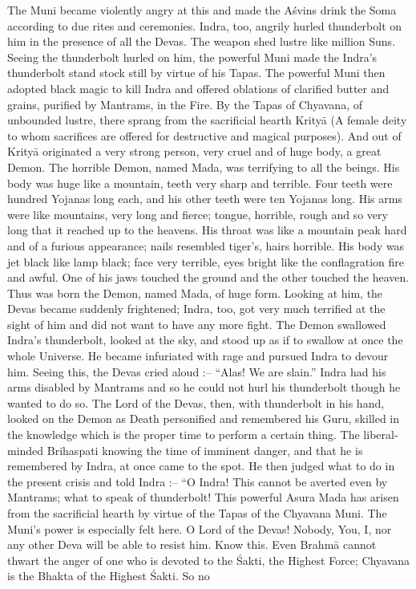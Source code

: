 The Muni became violently angry at this and made the A\'svins drink the Soma according to due rites and ceremonies. Indra, too, angrily hurled thunderbolt on him in the presence of all the Devas. The weapon shed lustre like million Suns. Seeing the thunderbolt hurled on him, the powerful Muni made the Indra's thunderbolt stand stock still by virtue of his Tapas. The powerful Muni then adopted black magic to kill Indra and offered oblations of clarified butter and grains, purified by Mantrams, in the Fire. By the Tapas of Chyavana, of unbounded lustre, there sprang from the sacrificial hearth Krity\=a (A female deity to whom sacrifices are offered for destructive and magical purposes). And out of Krity\=a originated a very strong person, very cruel and of huge body, a great Demon. The horrible Demon, named Mada, was terrifying to all the beings. His body was huge like a mountain, teeth very sharp and terrible. Four teeth were hundred Yojanas long each, and his other teeth were ten Yojanas long. His arms were like mountains, very long and fierce; tongue, horrible, rough and so very long that it reached up to the heavens. His throat was like a mountain peak hard and of a furious appearance; nails resembled tiger's, hairs horrible. His body was jet black like lamp black; face very terrible, eyes bright like the conflagration fire and awful. One of his jaws touched the ground and the other touched the heaven. Thus was born the Demon, named Mada, of huge form. Looking at him, the Devas became suddenly frightened; Indra, too, got very much terrified at the sight of him and did not want to have any more fight. The Demon swallowed Indra's thunderbolt, looked at the sky, and stood up as if to swallow at once the whole Universe. He became infuriated with rage and pursued Indra to devour him. Seeing this, the Devas cried aloud :-- ``Alas! We are slain.'' Indra had his arms disabled by Mantrams and so he could not hurl his thunderbolt though he wanted to do so. The Lord of the Devas, then, with thunderbolt in his hand, looked on the Demon as Death personified and remembered his Guru, skilled in the knowledge which is the proper time to perform a certain thing. The liberal-minded Brihaspati knowing the time of imminent danger, and that he is remembered by Indra, at once came to the spot. He then judged what to do in the present crisis and told Indra :-- ``O Indra! This cannot be averted even by Mantrams; what to speak of thunderbolt! This powerful Asura Mada has arisen from the sacrificial hearth by virtue of the Tapas of the Chyavana Muni. The Muni's power is especially felt here. O Lord of the Devas! Nobody, You, I, nor any other Deva will be able to resist him. Know this. Even Brahm\=a cannot thwart the anger of one who is devoted to the \'Sakti, the Highest Force; Chyavana is the Bhakta of the Highest \'Sakti. So no

